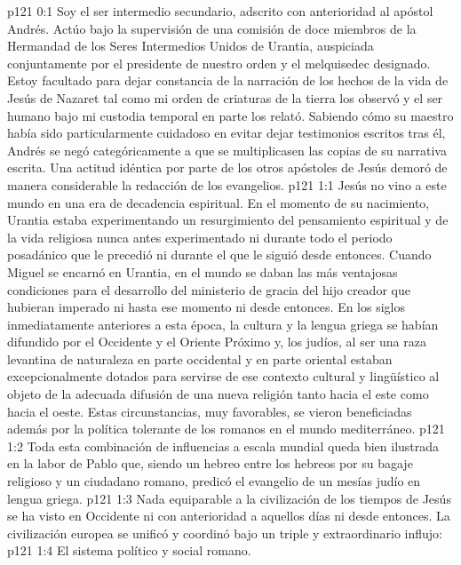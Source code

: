 \author{Comisión de seres intermedios}
\vs p121 0:1 Soy el ser intermedio secundario, adscrito con anterioridad al apóstol Andrés. Actúo bajo la supervisión de una comisión de doce miembros de la Hermandad de los Seres Intermedios Unidos de Urantia, auspiciada conjuntamente por el presidente de nuestro orden y el melquisedec designado. Estoy facultado para dejar constancia de la narración de los hechos de la vida de Jesús de Nazaret tal como mi orden de criaturas de la tierra los observó y el ser humano bajo mi custodia temporal en parte los relató. Sabiendo cómo su maestro había sido particularmente cuidadoso en evitar dejar testimonios escritos tras él, Andrés se negó categóricamente a que se multiplicasen las copias de su narrativa escrita. Una actitud idéntica por parte de los otros apóstoles de Jesús demoró de manera considerable la redacción de los evangelios.
\vs p121 1:1 Jesús no vino a este mundo en una era de decadencia espiritual. En el momento de su nacimiento, Urantia estaba experimentando un resurgimiento del pensamiento espiritual y de la vida religiosa nunca antes experimentado ni durante todo el periodo posadánico que le precedió ni durante el que le siguió desde entonces. Cuando Miguel se encarnó en Urantia, en el mundo se daban las más ventajosas condiciones para el desarrollo del ministerio de gracia del hijo creador que hubieran imperado ni hasta ese momento ni desde entonces. En los siglos inmediatamente anteriores a esta época, la cultura y la lengua griega se habían difundido por el Occidente y el Oriente Próximo y, los judíos, al ser una raza levantina de naturaleza en parte occidental y en parte oriental estaban excepcionalmente dotados para servirse de ese contexto cultural y lingüístico al objeto de la adecuada difusión de una nueva religión tanto hacia el este como hacia el oeste. Estas circunstancias, muy favorables, se vieron beneficiadas además por la política tolerante de los romanos en el mundo mediterráneo.
\vs p121 1:2 Toda esta combinación de influencias a escala mundial queda bien ilustrada en la labor de Pablo que, siendo un hebreo entre los hebreos por su bagaje religioso y un ciudadano romano, predicó el evangelio de un mesías judío en lengua griega.
\vs p121 1:3 Nada equiparable a la civilización de los tiempos de Jesús se ha visto en Occidente ni con anterioridad a aquellos días ni desde entonces. La civilización europea se unificó y coordinó bajo un triple y extraordinario influjo:
\vs p121 1:4 El sistema político y social romano.
